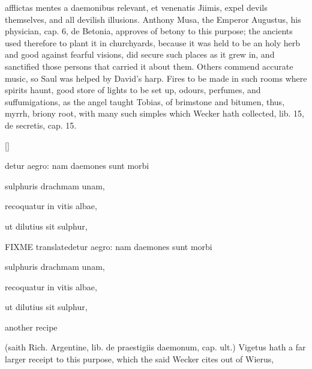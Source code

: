 {{afflictas mentes a daemonibus relevant, et venenatis Jiimis}, expel
devils themselves, and all devilish illusions. Anthony Musa, the
Emperor Augustus, his physician, \textlatin{cap. 6, de Betonia}, approves of betony
to this purpose; the ancients used therefore to plant it in
churchyards, because it was held to be an holy herb and good against
fearful visions, did secure such places as it grew in, and sanctified
those persons that carried it about them.  Others commend accurate music, so Saul was helped by
David's harp. Fires to be made in such rooms where spirits haunt, good
store of lights to be set up, odours, perfumes, and suffumigations, as
the angel taught Tobias, of brimstone and bitumen, thus, myrrh, briony
root, with many such simples which Wecker hath collected, \textlatin{lib. 15, de
secretis, cap. 15.}

\begin{Prescription}[H]
[\baselineskip]
{\centering%
\begin{minipage}[c]{0.4\textwidth}%
\begin{latin}%
\begin{prescriptionbox}{}{detur aegro: nam daemones sunt morbi}
\item sulphuris drachmam unam,
\item recoquatur in vitis albae,
\item ut dilutius sit sulphur,
\end{prescriptionbox}%
\end{latin}%
\end{minipage}%
\begin{minipage}[c]{0.4\textwidth}
\begin{latin}
\begin{prescriptionbox}{FIXME translate}{detur aegro: nam daemones sunt morbi}
\item sulphuris drachmam unam,
\item recoquatur in vitis albae,
\item ut dilutius sit sulphur,
\end{prescriptionbox}%
\end{latin}%
\end{minipage}\par
}%
\caption{another recipe}
\end{Prescription}

(saith Rich. Argentine, \textlatin{lib. de praestigiis daemonum, cap. ult.})
Vigetus hath a far larger receipt to this purpose, which the said
Wecker cites out of Wierus,

}
